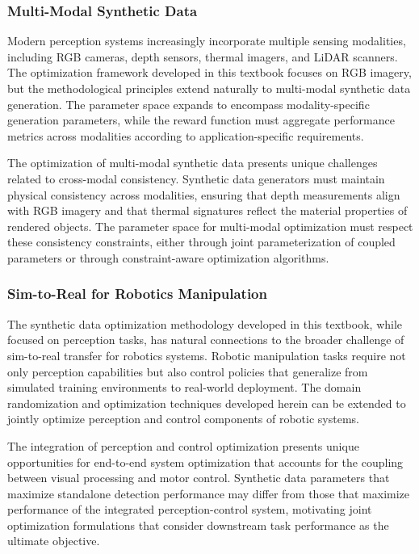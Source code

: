 \subsubsection{Multi-Modal Synthetic Data}
\label{subsubsec:multimodal}

Modern perception systems increasingly incorporate multiple sensing modalities, including RGB cameras, depth sensors, thermal imagers, and LiDAR scanners. The optimization framework developed in this textbook focuses on RGB imagery, but the methodological principles extend naturally to multi-modal synthetic data generation. The parameter space expands to encompass modality-specific generation parameters, while the reward function must aggregate performance metrics across modalities according to application-specific requirements.

The optimization of multi-modal synthetic data presents unique challenges related to cross-modal consistency. Synthetic data generators must maintain physical consistency across modalities, ensuring that depth measurements align with RGB imagery and that thermal signatures reflect the material properties of rendered objects. The parameter space for multi-modal optimization must respect these consistency constraints, either through joint parameterization of coupled parameters or through constraint-aware optimization algorithms.

\subsubsection{Sim-to-Real for Robotics Manipulation}
\label{subsubsec:robotics}

The synthetic data optimization methodology developed in this textbook, while focused on perception tasks, has natural connections to the broader challenge of sim-to-real transfer for robotics systems. Robotic manipulation tasks require not only perception capabilities but also control policies that generalize from simulated training environments to real-world deployment. The domain randomization and optimization techniques developed herein can be extended to jointly optimize perception and control components of robotic systems.

The integration of perception and control optimization presents unique opportunities for end-to-end system optimization that accounts for the coupling between visual processing and motor control. Synthetic data parameters that maximize standalone detection performance may differ from those that maximize performance of the integrated perception-control system, motivating joint optimization formulations that consider downstream task performance as the ultimate objective.

